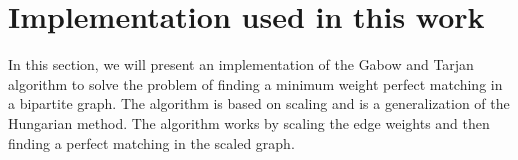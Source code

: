 \section{Implementation used in this work}

In this section, we will present an implementation of the Gabow and Tarjan algorithm to solve the problem of finding a minimum weight perfect matching in a bipartite graph. The algorithm is based on scaling and is a generalization of the Hungarian method. The algorithm works by scaling the edge weights and then finding a perfect matching in the scaled graph. 
